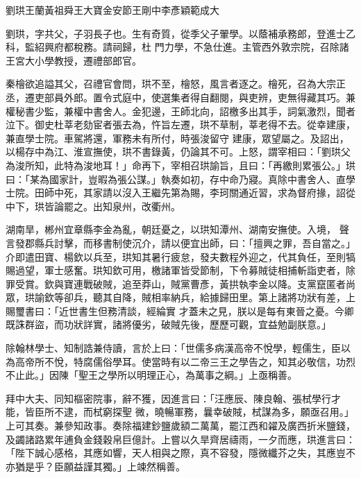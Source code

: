 
\begin{pinyinscope}

 劉珙王蘭黃祖舜王大寶金安節王剛中李彥穎範成大



 劉珙，字共父，子羽長子也。生有奇質，從季父子翬學。以蔭補承務郎，登進士乙科，監紹興府都稅務。請祠歸，杜
 門力學，不急仕進。主管西外敦宗院，召除諸王宮大小學教授，遷禮部郎官。



 秦檜欲追謚其父，召禮官會問，珙不至，檜怒，風言者逐之。檜死，召為大宗正丞，遷吏部員外郎。置令式庭中，使選集者得自翻閱，與吏辨，吏無得藏其巧。兼權秘書少監，兼權中書舍人。金犯邊，王師北向，詔檄多出其手，詞氣激烈，聞者泣下。御史杜莘老劾宦者張去為，忤旨左遷，珙不草制，莘老得不去。從幸建康，兼直學士院。車駕將還，軍務未有所付，時張浚留守
 建康，眾望屬之。及詔出，以楊存中為江、淮宣撫使，珙不書錄黃，仍論其不可。上怒，謂宰相曰：「劉珙父為浚所知，此特為浚地耳！」命再下，宰相召珙諭旨，且曰：「再繳則累張公。」珙曰：「某為國家計，豈暇為張公謀。」執奏如初，存中命乃寢。真除中書舍人、直學士院。田師中死，其家請以沒入王繼先第為賜，李珂關通近習，求為督府掾，詔從中下，珙皆論罷之。出知泉州，改衢州。



 湖南旱，郴州宜章縣李金為亂，朝廷憂之，以珙知潭州、湖南安撫使。入境，
 聲言發郡縣兵討擊，而移書制使沉介，請以便宜出師，曰：「擅興之罪，吾自當之。」介即遣田寶、楊欽以兵至，珙知其暑行疲怠，發夫數程外迎之，代其負任，至則犒賜過望，軍士感奮。珙知欽可用，檄諸軍皆受節制，下令募賊徒相捕斬詣吏者，除罪受賞。欽與寶連戰破賊，追至莽山，賊黨曹彥，黃拱執李金以降。支黨竄匿者尚眾，珙諭欽等卻兵，聽其自降，賊相率納兵，給據歸田里。第上諸將功狀有差，上賜璽書曰：「近世書生但務清談，經綸實
 才蓋未之見，朕以是每有東晉之憂。今卿既誅群盜，而功狀詳實，諸將優劣，破賊先後，歷歷可觀，宜益勉副朕意。」



 除翰林學士、知制誥兼侍讀，言於上曰：「世儒多病漢高帝不悅學，輕儒生，臣以為高帝所不悅，特腐儒俗學耳。使當時有以二帝三王之學告之，知其必敬信，功烈不止此。」因陳「聖王之學所以明理正心，為萬事之綱。」上亟稱善。



 拜中大夫、同知樞密院事，辭不獲，因進言曰：「汪應辰、陳良翰、張栻學行才能，皆臣所不逮，而栻窮探聖
 微，曉暢軍務，曩幸破賊，栻謀為多，願亟召用。」上可其奏。兼參知政事。奏除福建鈔鹽歲額二萬萬，罷江西和糴及廣西折米鹽錢，及蠲諸路累年逋負金錢穀帛巨億計。上嘗以久旱齊居禱雨，一夕而應，珙進言曰：「陛下誠心感格，其應如響，天人相與之際，真不容發，隱微纖芥之失，其應豈不亦猶是乎？臣願益謹其獨。」上竦然稱善。




\end{pinyinscope}
